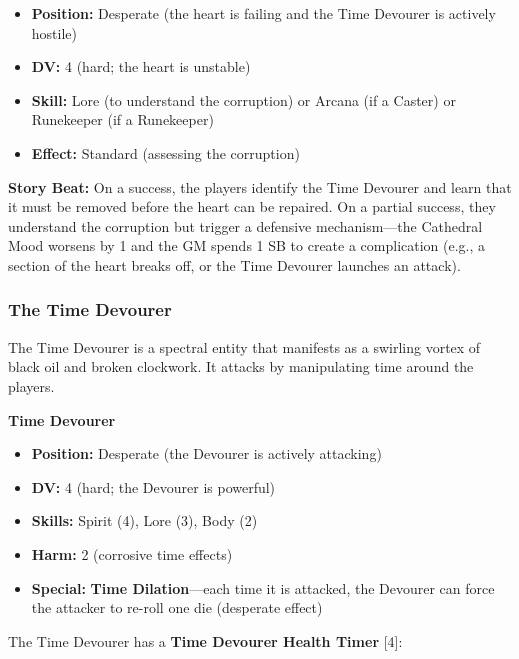 \documentclass{article}
\begin{document}
\begin{itemize}
    \item \textbf{Position:} Desperate (the heart is failing and the Time Devourer is actively hostile)
    \item \textbf{DV:} 4 (hard; the heart is unstable)
    \item \textbf{Skill:} Lore (to understand the corruption) or Arcana (if a Caster) or Runekeeper (if a Runekeeper)
    \item \textbf{Effect:} Standard (assessing the corruption)
\end{itemize}

\begin{storybox}
\textbf{Story Beat:} On a success, the players identify the Time Devourer and learn that it must be removed before the heart can be repaired. On a partial success, they understand the corruption but trigger a defensive mechanism---the Cathedral Mood worsens by 1 and the GM spends 1 SB to create a complication (e.g., a section of the heart breaks off, or the Time Devourer launches an attack).
\end{storybox}

\subsubsection{The Time Devourer}

The Time Devourer is a spectral entity that manifests as a swirling vortex of black oil and broken clockwork. It attacks by manipulating time around the players.

\begin{center}
\textbf{Time Devourer}
\end{center}

\begin{itemize}
    \item \textbf{Position:} Desperate (the Devourer is actively attacking)
    \item \textbf{DV:} 4 (hard; the Devourer is powerful)
    \item \textbf{Skills:} Spirit (4), Lore (3), Body (2)
    \item \textbf{Harm:} 2 (corrosive time effects)
    \item \textbf{Special:} \textbf{Time Dilation}---each time it is attacked, the Devourer can force the attacker to re-roll one die (desperate effect)
\end{itemize}

The Time Devourer has a \textbf{Time Devourer Health Timer } [4]:
\end{document}
